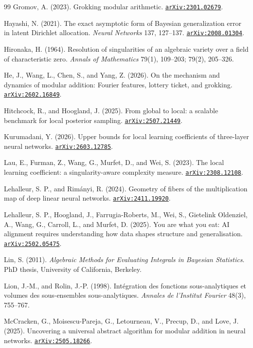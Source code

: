 \documentclass[11pt]{amsart}
\newcommand{\arxiv}[1]{\href{https://arxiv.org/abs/#1}{\texttt{arXiv:#1}}}
\theoremstyle{plain}
\theoremstyle{definition}
\begin{document}
\begin{thebibliography}{99}
Gromov, A. (2023). Grokking modular arithmetic. \arxiv{2301.02679}.

Hayashi, N. (2021). The exact asymptotic form of Bayesian generalization error in latent Dirichlet allocation. \emph{Neural Networks} 137, 127--137. \arxiv{2008.01304}.

Hironaka, H. (1964). Resolution of singularities of an algebraic variety over a field of characteristic zero. \emph{Annals of Mathematics} 79(1), 109--203; 79(2), 205--326.

He, J., Wang, L., Chen, S., and Yang, Z. (2026). On the mechanism and dynamics of modular addition: Fourier features, lottery ticket, and grokking. \arxiv{2602.16849}.

Hitchcock, R., and Hoogland, J. (2025). From global to local: a scalable benchmark for local posterior sampling. \arxiv{2507.21449}.

Kurumadani, Y. (2026). Upper bounds for local learning coefficients of three-layer neural networks. \arxiv{2603.12785}.

Lau, E., Furman, Z., Wang, G., Murfet, D., and Wei, S. (2023). The local learning coefficient: a singularity-aware complexity measure. \arxiv{2308.12108}.

Lehalleur, S. P., and Rim\'anyi, R. (2024). Geometry of fibers of the multiplication map of deep linear neural networks. \arxiv{2411.19920}.

Lehalleur, S. P., Hoogland, J., Farrugia-Roberts, M., Wei, S., Gietelink Oldenziel, A., Wang, G., Carroll, L., and Murfet, D. (2025). You are what you eat: AI alignment requires understanding how data shapes structure and generalisation. \arxiv{2502.05475}.

Lin, S. (2011). \emph{Algebraic Methods for Evaluating Integrals in Bayesian Statistics}. PhD thesis, University of California, Berkeley.

Lion, J.-M., and Rolin, J.-P. (1998). Int\'egration des fonctions sous-analytiques et volumes des sous-ensembles sous-analytiques. \emph{Annales de l'Institut Fourier} 48(3), 755--767.

McCracken, G., Moisescu-Pareja, G., Letourneau, V., Precup, D., and Love, J. (2025). Uncovering a universal abstract algorithm for modular addition in neural networks. \arxiv{2505.18266}.


\end{thebibliography}
\end{document}
